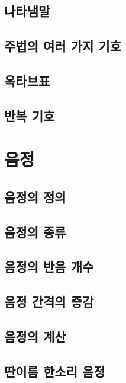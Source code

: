 \documentclass[12pt, a4paper, oneside]{book}
\let\stdsection\section
\renewcommand\section{\newpage\stdsection}
\begin{document}
	\subsection{나타냄말}

	\subsection{주법의 여러 가지 기호}

	\subsection{옥타브표}

	\subsection{반복 기호}

%
	\section{음정}

	\subsection{음정의 정의}

	\subsection{음정의 종류}

	\subsection{음정의 반음 개수}

	\subsection{음정 간격의 증감}

	\subsection{음정의 계산}

	\subsection{딴이름 한소리 음정}
\end{document}
